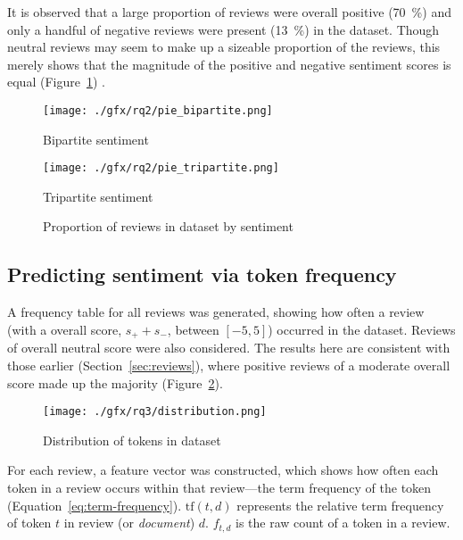\documentclass[12pt, a4paper]{pancake-article}
\begin{document}
It is observed that a large proportion of reviews were overall positive (\qty{70}{\percent})
and only a handful of negative reviews were present (\qty{13}{\percent}) in the dataset.
Though neutral reviews may seem to make up a sizeable proportion of the reviews, this merely
shows that the magnitude of the positive and negative sentiment scores is equal (Figure~\ref{fig:pies})
.

\begin{figure}[htpb]
	\centering
	\begin{minipage}{0.5\textwidth}
		\centering
		\texttt{[image: ./gfx/rq2/pie\_bipartite.png]}
		\caption*{Bipartite sentiment}
	\end{minipage}\hfill
	\begin{minipage}{0.5\textwidth}
		\centering
		\texttt{[image: ./gfx/rq2/pie\_tripartite.png]}
		\caption*{Tripartite sentiment}
	\end{minipage}
	\caption{Proportion of reviews in dataset by sentiment}
	\label{fig:pies}
\end{figure}

\subsection{Predicting sentiment via token frequency}

A frequency table for all reviews was generated, showing how
often a review (with a overall score, \(s_+ + s_-\), between \(\left[-5, 5\right]\))
occurred in the dataset. Reviews of overall neutral score were also considered.
The results here are consistent with those earlier (Section~\ref{sec:reviews}),
where positive reviews of a moderate overall score made up the majority (Figure~\ref{fig:distribution}).

\begin{figure}[htpb]
	\centering
	\texttt{[image: ./gfx/rq3/distribution.png]}
	\caption{Distribution of tokens in dataset}
	\label{fig:distribution}
\end{figure}

For each review, a feature vector was constructed, which shows how
often each token in a review occurs within that review---the term frequency
of the token (Equation~\ref{eq:term-frequency}). \(\text{tf}\left(t, d\right)\)
represents the relative term frequency of token \(t\) in review (or \textit{document})
\(d\). \(f_{t, d}\) is the raw count of a token in a review.
\end{document}
